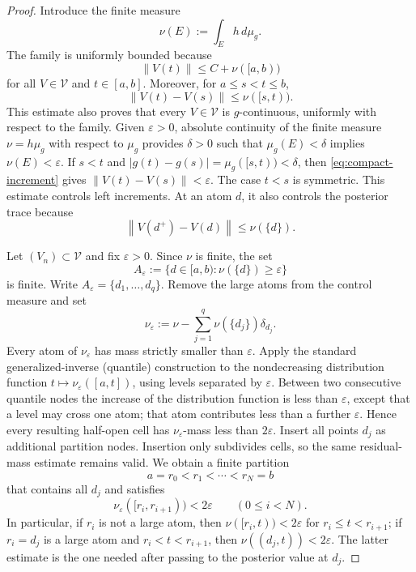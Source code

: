 \documentclass[preprint,12pt]{elsarticle}
\newenvironment{revision}{\begingroup\color{red}}{\endgroup}
\newenvironment{revision}{}{}
\newcommand{\newrev}[1]{{\color{red}#1}}
\newcommand{\newrev}[1]{#1}
\theoremstyle{definition}
\theoremstyle{remark}
\newcommand{\norm}[1]{\left\lVert#1\right\rVert}
\begin{document}
\begin{proof}
Introduce the finite measure
\[
 \nu(E):=\int_Eh\,d\mu_g.
\]
The family is uniformly bounded because
\[
 \norm{V(t)}\le C+\nu([a,b))
\]
for all $V\in\mathcal V$ and $t\in[a,b]$. Moreover, for $a\le s<t\le b$,
\begin{equation}\label{eq:compact-increment}
 \norm{V(t)-V(s)}
 \le \nu([s,t)).
\end{equation}
\begin{revision}
This estimate also proves that every \(V\in\mathcal V\) is
\(g\)-continuous, uniformly with respect to the family. Given
\(\varepsilon>0\), absolute continuity of the finite measure
\(\nu=h\mu_g\) with respect to \(\mu_g\) provides \(\delta>0\) such that
\(\mu_g(E)<\delta\) implies \(\nu(E)<\varepsilon\). If \(s<t\) and
\(|g(t)-g(s)|=\mu_g([s,t))<\delta\), then
\eqref{eq:compact-increment} gives \(\|V(t)-V(s)\|<\varepsilon\). The case
\(t<s\) is symmetric.
\end{revision}
This estimate controls left increments. At an atom $d$, it also controls the posterior trace because
\[
 \norm{V(d^+)-V(d)}\le \nu(\{d\}).
\]

Let $(V_n)\subset\mathcal V$ and fix $\varepsilon>0$. Since $\nu$ is finite, the set
\[
 A_\varepsilon:=\{d\in[a,b):\nu(\{d\})\ge\varepsilon\}
\]
is finite. Write $A_\varepsilon=\{d_1,\ldots,d_q\}$.
\newrev{Remove the large atoms from the control measure and set
\[
 \nu_\varepsilon
 :=\nu-\sum_{j=1}^q\nu(\{d_j\})\delta_{d_j}.
\]
Every atom of $\nu_\varepsilon$ has mass strictly smaller than
$\varepsilon$. Apply the standard generalized-inverse (quantile)
construction to the nondecreasing distribution function
$t\mapsto\nu_\varepsilon([a,t])$, using levels separated by
$\varepsilon$. Between two consecutive quantile nodes the increase of the
distribution function is less than $\varepsilon$, except that a level may
cross one atom; that atom contributes less than a further $\varepsilon$.
Hence every resulting half-open cell has $\nu_\varepsilon$-mass less than
$2\varepsilon$. Insert all points $d_j$ as additional partition nodes.
Insertion only subdivides cells, so the same residual-mass estimate remains
valid. We obtain a finite partition}
\[
 a=r_0<r_1<\cdots<r_N=b
\]
\newrev{that contains all $d_j$ and satisfies
\[
 \nu_\varepsilon([r_i,r_{i+1}))<2\varepsilon
 \qquad(0\le i<N).
\]
In particular, if $r_i$ is not a large atom, then
$\nu([r_i,t))<2\varepsilon$ for $r_i\le t<r_{i+1}$; if
$r_i=d_j$ is a large atom and $r_i<t<r_{i+1}$, then
$\nu((d_j,t))<2\varepsilon$. The latter estimate is the one needed after
passing to the posterior value at $d_j$.}


\end{proof}
\end{document}
